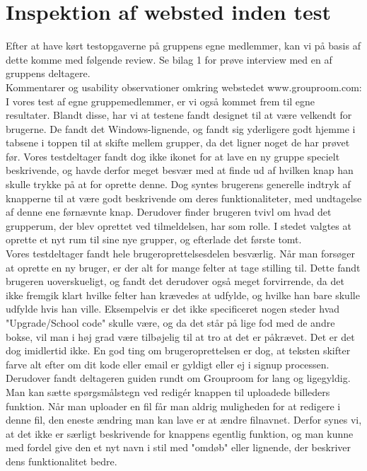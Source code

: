 \documentclass[12pt]{article}
\begin{document}
\section{Inspektion af websted inden test}
Efter at have kørt testopgaverne på gruppens egne medlemmer, kan vi på basis af dette komme med følgende review. Se bilag 1 for prøve interview med en af gruppens deltagere.\\

\noindent Kommentarer og usability observationer omkring webstedet www.grouproom.com:\\

\noindent I vores test af egne gruppemedlemmer, er vi også kommet frem til egne resultater. Blandt disse, har vi at testene fandt designet til at være velkendt for brugerne. De fandt det Windows-lignende, og fandt sig yderligere godt hjemme i tabsene i toppen til at skifte mellem grupper, da det ligner noget de har prøvet før. Vores testdeltager fandt dog ikke ikonet for at lave en ny gruppe specielt beskrivende, og havde derfor meget besvær med at finde ud af hvilken knap han skulle trykke på at for oprette denne. Dog syntes brugerens generelle indtryk af knapperne til at være godt beskrivende om deres funktionaliteter, med undtagelse af denne ene førnævnte knap. Derudover finder brugeren tvivl om hvad det grupperum, der blev oprettet ved tilmeldelsen, har som rolle. I stedet valgtes at oprette et nyt rum til sine nye grupper, og efterlade det første tomt.\\

\noindent Vores testdeltager fandt hele brugeroprettelsesdelen besværlig. Når man forsøger at oprette en ny bruger, er der alt for mange felter at tage stilling til. Dette fandt brugeren uoverskueligt, og fandt det derudover også meget forvirrende, da det ikke fremgik klart hvilke felter han krævedes at udfylde, og hvilke han bare skulle udfylde hvis han ville. Eksempelvis er det ikke specificeret nogen steder hvad "Upgrade/School code" skulle være, og da det står på lige fod med de andre bokse, vil man i høj grad være tilbøjelig til at tro at det er påkrævet. Det er det dog imidlertid ikke. En god ting om brugeroprettelsen er dog, at teksten skifter farve alt efter om dit kode eller email er gyldigt eller ej i signup processen. Derudover fandt deltageren guiden rundt om Grouproom for lang og ligegyldig.\\

\noindent Man kan sætte spørgsmålstegn ved redigér knappen til uploadede billeders funktion. Når man uploader en fil får man aldrig muligheden for at redigere i denne fil, den eneste ændring man kan lave er at ændre filnavnet. Derfor synes vi, at det ikke er særligt beskrivende for knappens egentlig funktion, og man kunne med fordel give den et nyt navn i stil med "omdøb" eller lignende, der beskriver dens funktionalitet bedre.\\
\end{document}
